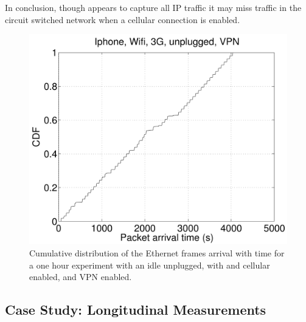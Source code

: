 In conclusion, though \meddle appears to capture all IP traffic it may
miss traffic in the circuit switched network when a cellular connection is enabled.

\begin{figure}
\centering
        \includegraphics[width=0.8\linewidth]{../../code/pushNotification/Fig/bw_iphone_wifi_3g_unplug_vpn_ts.pdf}
  \caption{Cumulative distribution of the Ethernet frames
          arrival with time for a one hour experiment with an idle
          \iphone{} unplugged, with \wifi{} and cellular enabled, and VPN
          enabled.}
  \label{fig:push_w3v_ts}
   \vspace{\postfigspace}
\end{figure}


\subsection{Case Study: Longitudinal Measurements }
\label{sec:case-study-google}



